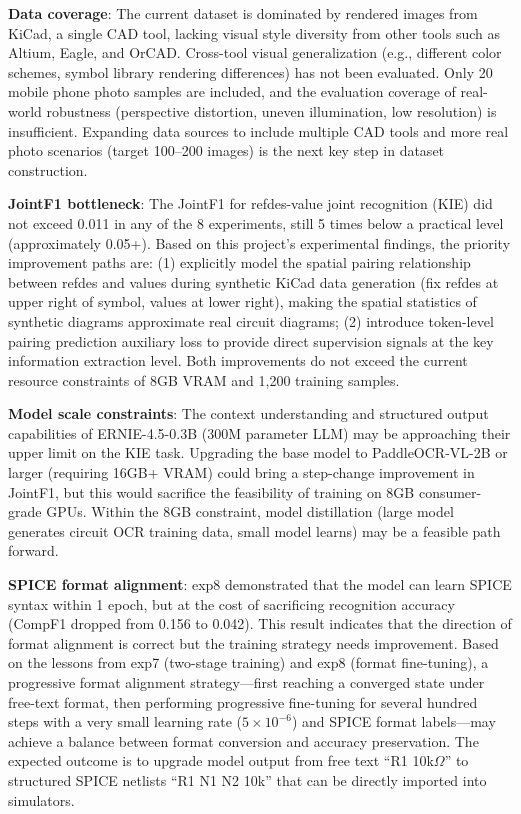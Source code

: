 \textbf{Data coverage}: The current dataset is dominated by rendered images from KiCad, a single CAD tool, lacking visual style diversity from other tools such as Altium, Eagle, and OrCAD. Cross-tool visual generalization (e.g., different color schemes, symbol library rendering differences) has not been evaluated. Only 20 mobile phone photo samples are included, and the evaluation coverage of real-world robustness (perspective distortion, uneven illumination, low resolution) is insufficient. Expanding data sources to include multiple CAD tools and more real photo scenarios (target 100--200 images) is the next key step in dataset construction.

\textbf{JointF1 bottleneck}: The JointF1 for refdes-value joint recognition (KIE) did not exceed 0.011 in any of the 8 experiments, still 5 times below a practical level (approximately 0.05+). Based on this project's experimental findings, the priority improvement paths are: (1) explicitly model the spatial pairing relationship between refdes and values during synthetic KiCad data generation (fix refdes at upper right of symbol, values at lower right), making the spatial statistics of synthetic diagrams approximate real circuit diagrams; (2) introduce token-level pairing prediction auxiliary loss to provide direct supervision signals at the key information extraction level. Both improvements do not exceed the current resource constraints of 8GB VRAM and 1,200 training samples.

\textbf{Model scale constraints}: The context understanding and structured output capabilities of ERNIE-4.5-0.3B (300M parameter LLM) may be approaching their upper limit on the KIE task. Upgrading the base model to PaddleOCR-VL-2B or larger (requiring 16GB+ VRAM) could bring a step-change improvement in JointF1, but this would sacrifice the feasibility of training on 8GB consumer-grade GPUs. Within the 8GB constraint, model distillation (large model generates circuit OCR training data, small model learns) may be a feasible path forward.

\textbf{SPICE format alignment}: exp8 demonstrated that the model can learn SPICE syntax within 1 epoch, but at the cost of sacrificing recognition accuracy (CompF1 dropped from 0.156 to 0.042). This result indicates that the direction of format alignment is correct but the training strategy needs improvement. Based on the lessons from exp7 (two-stage training) and exp8 (format fine-tuning), a progressive format alignment strategy---first reaching a converged state under free-text format, then performing progressive fine-tuning for several hundred steps with a very small learning rate ($5\times10^{-6}$) and SPICE format labels---may achieve a balance between format conversion and accuracy preservation. The expected outcome is to upgrade model output from free text ``R1 10k$\Omega$'' to structured SPICE netlists ``R1 N1 N2 10k'' that can be directly imported into simulators.

